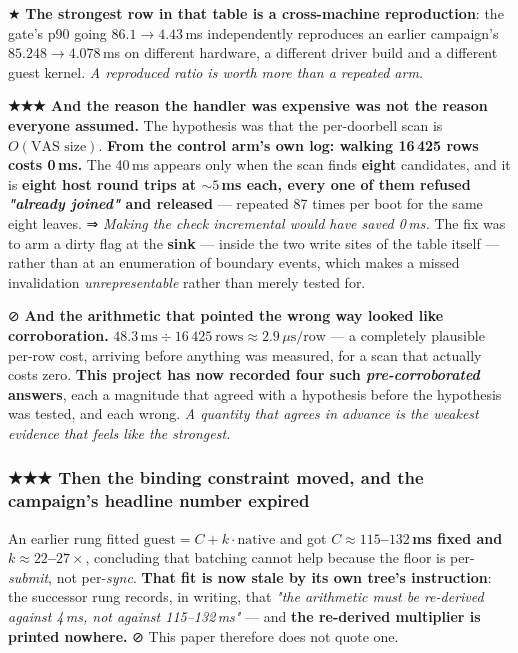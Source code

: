 \documentclass[10.5pt]{article}
\begin{document}
★ \textbf{The strongest row in that table is a cross-machine reproduction}: the gate's p90 going
$86.1 \to 4.43$\,ms independently reproduces an earlier campaign's $85.248 \to 4.078$\,ms on
different hardware, a different driver build and a different guest kernel. \emph{A reproduced
ratio is worth more than a repeated arm.}

\begin{claimbox}\small
\textbf{★★★ And the reason the handler was expensive was not the reason everyone assumed.} The
hypothesis was that the per-doorbell scan is $O(\text{VAS size})$. \textbf{From the control arm's
own log: walking 16\,425 rows costs 0\,ms.} The 40\,ms appears only when the scan finds
\textbf{eight} candidates, and it is \textbf{eight host round trips at ${\sim}5$\,ms each, every
one of them refused \emph{"already joined"} and released} — repeated 87 times per boot for the
same eight leaves. ⇒ \emph{Making the check incremental would have saved 0\,ms.} The fix was to
arm a dirty flag at the \textbf{sink} — inside the two write sites of the table itself — rather
than at an enumeration of boundary events, which makes a missed invalidation
\emph{unrepresentable} rather than merely tested for.

\smallskip
⊘ \textbf{And the arithmetic that pointed the wrong way looked like corroboration.}
$48.3\,\text{ms} \div 16\,425\ \text{rows} \approx 2.9\,\mu\text{s/row}$ — a completely plausible
per-row cost, arriving before anything was measured, for a scan that actually costs zero.
\textbf{This project has now recorded four such \emph{pre-corroborated} answers}, each a magnitude
that agreed with a hypothesis before the hypothesis was tested, and each wrong. \emph{A quantity
that agrees in advance is the weakest evidence that feels like the strongest.}
\end{claimbox}

\subsubsection*{★★★ Then the binding constraint moved, and the campaign's headline number expired}

An earlier rung fitted $\text{guest} = C + k \cdot \text{native}$ and got \textbf{$C \approx
115$--$132$\,ms fixed and $k \approx 22$--$27\times$}, concluding that batching cannot help
because the floor is per-\emph{submit}, not per-\emph{sync}. \textbf{That fit is now stale by its
own tree's instruction}: the successor rung records, in writing, that \emph{"the arithmetic must
be re-derived against 4\,ms, not against 115--132\,ms"} — and \textbf{the re-derived multiplier is
printed nowhere.} ⊘ This paper therefore does not quote one.
\end{document}
